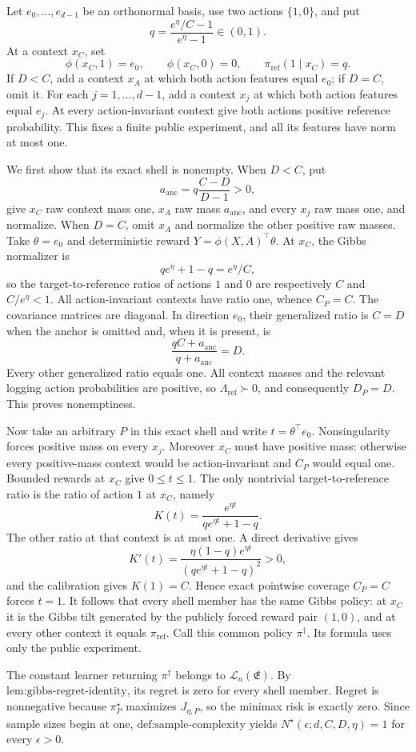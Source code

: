 Let \(e_0,\ldots,e_{d-1}\) be an orthonormal basis, use two actions \(\{1,0\}\), and put
\[
q=\frac{e^\eta/C-1}{e^\eta-1}\in(0,1).
\]
At a context \(x_C\), set
\[
\phi(x_C,1)=e_0,\qquad \phi(x_C,0)=0,\qquad
\pi_{\mathrm{ref}}(1\mid x_C)=q.
\]
If \(D<C\), add a context \(x_A\) at which both action features equal \(e_0\); if \(D=C\), omit it. For each \(j=1,\ldots,d-1\), add a context \(x_j\) at which both action features equal \(e_j\). At every action-invariant context give both actions positive reference probability. This fixes a finite public experiment, and all its features have norm at most one.

We first show that its exact shell is nonempty. When \(D<C\), put
\[
a_{\mathrm{anc}}=q\frac{C-D}{D-1}>0,
\]
give \(x_C\) raw context mass one, \(x_A\) raw mass \(a_{\mathrm{anc}}\), and every \(x_j\) raw mass one, and normalize. When \(D=C\), omit \(x_A\) and normalize the other positive raw masses. Take \(\theta=e_0\) and deterministic reward \(Y=\phi(X,A)^\top\theta\). At \(x_C\), the Gibbs normalizer is
\[
qe^\eta+1-q=e^\eta/C,
\]
so the target-to-reference ratios of actions \(1\) and \(0\) are respectively \(C\) and \(C/e^\eta<1\). All action-invariant contexts have ratio one, whence \(C_P=C\). The covariance matrices are diagonal. In direction \(e_0\), their generalized ratio is \(C=D\) when the anchor is omitted and, when it is present, is
\[
\frac{qC+a_{\mathrm{anc}}}{q+a_{\mathrm{anc}}}=D.
\]
Every other generalized ratio equals one. All context masses and the relevant logging action probabilities are positive, so \(\Lambda_{\mathrm{ref}}\succ0\), and consequently \(D_P=D\). This proves nonemptiness.

Now take an arbitrary \(P\) in this exact shell and write \(t=\theta^\top e_0\). Nonsingularity forces positive mass on every \(x_j\). Moreover \(x_C\) must have positive mass: otherwise every positive-mass context would be action-invariant and \(C_P\) would equal one. Bounded rewards at \(x_C\) give \(0\le t\le1\). The only nontrivial target-to-reference ratio is the ratio of action \(1\) at \(x_C\), namely
\[
K(t)=\frac{e^{\eta t}}{qe^{\eta t}+1-q}.
\]
The other ratio at that context is at most one. A direct derivative gives
\[
K'(t)=\frac{\eta(1-q)e^{\eta t}}{(qe^{\eta t}+1-q)^2}>0,
\]
and the calibration gives \(K(1)=C\). Hence exact pointwise coverage \(C_P=C\) forces \(t=1\). It follows that every shell member has the same Gibbs policy: at \(x_C\) it is the Gibbs tilt generated by the publicly forced reward pair \((1,0)\), and at every other context it equals \(\pi_{\mathrm{ref}}\). Call this common policy \(\pi^\dagger\). Its formula uses only the public experiment.

The constant learner returning \(\pi^\dagger\) belongs to \(\mathcal L_n(\mathfrak E)\). By \(\text{lem:gibbs-regret-identity}\), its regret is zero for every shell member. Regret is nonnegative because \(\pi_P^\star\) maximizes \(J_{\eta,P}\), so the minimax risk is exactly zero. Since sample sizes begin at one, \(\text{def:sample-complexity}\) yields \(N^\star(\epsilon;d,C,D,\eta)=1\) for every \(\epsilon>0\).